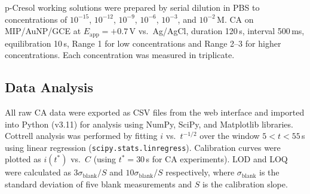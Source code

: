 p-Cresol working solutions were prepared by serial dilution in PBS to concentrations of $10^{-15}$, $10^{-12}$, $10^{-9}$, $10^{-6}$, $10^{-3}$, and $10^{-2}$\,M. CA on MIP/AuNP/GCE at $E_\text{app} = +0.7$\,V vs.\ Ag/AgCl, duration 120\,s, interval 500\,ms, equilibration 10\,s, Range 1 for low concentrations and Range 2--3 for higher concentrations. Each concentration was measured in triplicate.

\subsection{Data Analysis}

All raw CA data were exported as CSV files from the web interface and imported into Python (v3.11) for analysis using NumPy, SciPy, and Matplotlib libraries. Cottrell analysis was performed by fitting $i$ vs.\ $t^{-1/2}$ over the window $5 < t < 55$\,s using linear regression (\texttt{scipy.stats.linregress}). Calibration curves were plotted as $i(t^*)$ vs.\ $C$ (using $t^* = 30$\,s for CA experiments). LOD and LOQ were calculated as $3\sigma_\text{blank}/S$ and $10\sigma_\text{blank}/S$ respectively, where $\sigma_\text{blank}$ is the standard deviation of five blank measurements and $S$ is the calibration slope.
